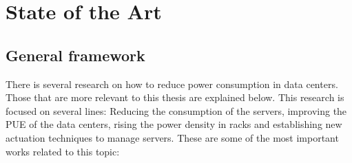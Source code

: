 
\section{State of the Art}
\subsection{General framework}

There is several research on how to reduce power consumption in data centers. Those that are more relevant to this thesis are explained below. This research is focused on several lines: Reducing the consumption of the servers, improving the PUE of the data centers, rising the power density in racks and establishing new actuation techniques to manage servers. These are some of the most important works related to this topic:

